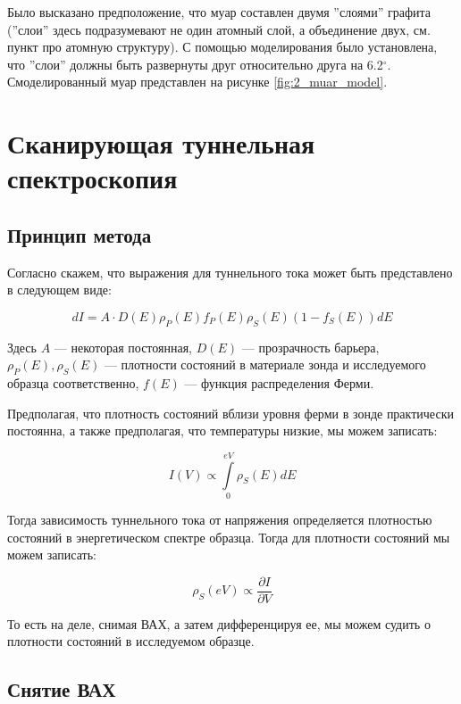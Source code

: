 \documentclass[a4paper, 12pt]{article}
\begin{document}
	Было высказано предположение, что муар составлен двумя ''слоями'' графита (''слои'' здесь подразумевают не один атомный слой, а объединение двух, см. пункт про атомную структуру). С помощью моделирования было установлена, что ''слои'' должны быть развернуты друг относительно друга на 6.2$^\circ$. Смоделированный муар представлен на рисунке \ref{fig:2_muar_model}.
	
	\section{Сканирующая туннельная спектроскопия}
	
	\subsection{Принцип метода}
	
	Согласно \cite{Mironov} скажем, что выражения для туннельного тока может быть представлено в следующем виде:
	
	\begin{equation}
		dI = A \cdot D(E) \rho_P (E) f_P(E) \rho_S(E)(1 - f_S(E)) dE
	\end{equation}
	
	Здесь $A$ --- некоторая постоянная, $D(E)$ --- прозрачность барьера, $\rho_P(E), \rho_S(E)$ --- плотности состояний в материале зонда и исследуемого образца соответственно, $f(E)$ --- функция распределения Ферми.
	
	Предполагая, что плотность состояний вблизи уровня ферми в зонде практически постоянна, а также предполагая, что температуры низкие, мы можем записать:
	
	\begin{equation}
		I(V) \propto \int\limits_0^{eV} \rho_S(E)dE 
	\end{equation} 
	
	Тогда зависимость туннельного тока от напряжения определяется плотностью состояний в энергетическом спектре образца. Тогда для плотности состояний мы можем записать:
	
	\begin{equation}
		\rho_S(eV) \propto \frac{\partial I}{\partial V}
	\end{equation}
	
	То есть на деле, снимая ВАХ, а затем дифференцируя ее, мы можем судить о плотности состояний в исследуемом образце.
	
	\subsection{Снятие ВАХ}
	
\end{document}

